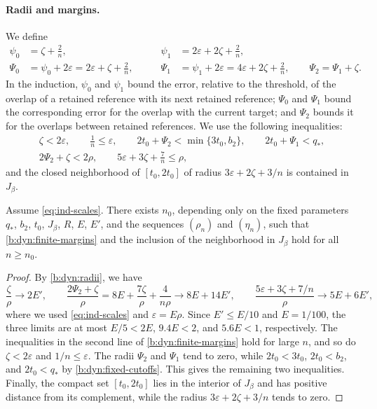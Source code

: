 \paragraph{Radii and margins.} We define
\begin{equation}\label{b:dyn:radii}
 \begin{aligned}
 \psi_0&=\zeta+\frac2n, & \psi_1&=2\varepsilon+2\zeta+\frac2n,\\
 \Psi_0&=\psi_0+2\varepsilon=2\varepsilon+\zeta+\frac2n,\qquad &
 \Psi_1&=\psi_1+2\varepsilon=4\varepsilon+2\zeta+\frac2n,\qquad
 \Psi_2=\Psi_1+\zeta.
 \end{aligned}
\end{equation}
In the induction, $\psi_0$ and $\psi_1$ bound the error, relative to the threshold, of the overlap of a retained reference with its next retained reference; $\Psi_0$ and $\Psi_1$ bound the corresponding error for the overlap with the current target; and $\Psi_2$ bounds it for the overlaps between retained references. We use the following inequalities:
\begin{equation}\label{b:dyn:finite-margins}
 \begin{gathered}
 \zeta<2\varepsilon,\qquad \frac1n\le\varepsilon,\qquad
 2t_0+\Psi_2<\min\{3t_0,b_2\},\qquad 2t_0+\Psi_1<q_*,\\
 2\Psi_2+\zeta<2\rho,\qquad 5\varepsilon+3\zeta+\frac7n\le\rho,
 \end{gathered}
\end{equation}
and the closed neighborhood of $[t_0,2t_0]$ of radius $3\varepsilon+2\zeta+3/n$ is contained in $J_\beta$.

\begin{lemma}\label{lem:ind-margins}
Assume \eqref{eq:ind-scales}. There exists $n_0$, depending only on the fixed parameters $q_*$, $b_2$, $t_0$, $J_\beta$, $R$, $E$, $E'$, and the sequences $(\rho_n)$ and $(\eta_n)$, such that \eqref{b:dyn:finite-margins} and the inclusion of the neighborhood in $J_\beta$ hold for all $n\ge n_0$.
\end{lemma}

\begin{proof}
By \eqref{b:dyn:radii}, we have
\[
 \frac{\zeta}{\rho}\to2E',\qquad
 \frac{2\Psi_2+\zeta}{\rho}=8E+\frac{7\zeta}{\rho}+\frac4{n\rho}\to8E+14E',\qquad
 \frac{5\varepsilon+3\zeta+7/n}{\rho}\to5E+6E',
\]
where we used \eqref{eq:ind-scales} and $\varepsilon=E\rho$. Since $E'\le E/10$ and $E=1/100$, the three limits are at most $E/5<2E$, $9.4E<2$, and $5.6E<1$, respectively. The inequalities in the second line of \eqref{b:dyn:finite-margins} hold for large $n$, and so do $\zeta<2\varepsilon$ and $1/n\le\varepsilon$. The radii $\Psi_2$ and $\Psi_1$ tend to zero, while $2t_0<3t_0$, $2t_0<b_2$, and $2t_0<q_*$ by \eqref{b:dyn:fixed-cutoffs}. This gives the remaining two inequalities. Finally, the compact set $[t_0,2t_0]$ lies in the interior of $J_\beta$ and has positive distance from its complement, while the radius $3\varepsilon+2\zeta+3/n$ tends to zero.
\end{proof}

